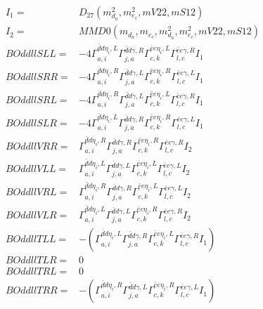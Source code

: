 \documentclass[A4,landscape]{article}
\begin{document}
\begin{align} 
I_1 = & D_{27}(m^2_{d_{{a}}}, m^2_{e_{{c}}}, mV22, mS12) \\ 
I_2 = & MMD0(m_{d_{{a}}}, m_{e_{{c}}}, m^2_{d_{{a}}}, m^2_{e_{{c}}}, mV22, mS12) \\ 
  BOddllSLL= & -4  \Gamma^{\bar{d}d \eta_i ,L}_{a, i} \Gamma^{\bar{d}d \gamma ,R}_{j, a} \Gamma^{\bar{e}e \eta_i ,L}_{c, k} \Gamma^{\bar{e}e \gamma ,R}_{l, c} I_1 \\ 
  BOddllSRR= & -4  \Gamma^{\bar{d}d \eta_i ,R}_{a, i} \Gamma^{\bar{d}d \gamma ,L}_{j, a} \Gamma^{\bar{e}e \eta_i ,R}_{c, k} \Gamma^{\bar{e}e \gamma ,L}_{l, c} I_1 \\ 
  BOddllSRL= & -4  \Gamma^{\bar{d}d \eta_i ,R}_{a, i} \Gamma^{\bar{d}d \gamma ,L}_{j, a} \Gamma^{\bar{e}e \eta_i ,L}_{c, k} \Gamma^{\bar{e}e \gamma ,R}_{l, c} I_1 \\ 
  BOddllSLR= & -4  \Gamma^{\bar{d}d \eta_i ,L}_{a, i} \Gamma^{\bar{d}d \gamma ,R}_{j, a} \Gamma^{\bar{e}e \eta_i ,R}_{c, k} \Gamma^{\bar{e}e \gamma ,L}_{l, c} I_1 \\ 
  BOddllVRR= &  \Gamma^{\bar{d}d \eta_i ,R}_{a, i} \Gamma^{\bar{d}d \gamma ,R}_{j, a} \Gamma^{\bar{e}e \eta_i ,R}_{c, k} \Gamma^{\bar{e}e \gamma ,R}_{l, c} I_2 \\ 
  BOddllVLL= &  \Gamma^{\bar{d}d \eta_i ,L}_{a, i} \Gamma^{\bar{d}d \gamma ,L}_{j, a} \Gamma^{\bar{e}e \eta_i ,L}_{c, k} \Gamma^{\bar{e}e \gamma ,L}_{l, c} I_2 \\ 
  BOddllVRL= &  \Gamma^{\bar{d}d \eta_i ,R}_{a, i} \Gamma^{\bar{d}d \gamma ,R}_{j, a} \Gamma^{\bar{e}e \eta_i ,L}_{c, k} \Gamma^{\bar{e}e \gamma ,L}_{l, c} I_2 \\ 
  BOddllVLR= &  \Gamma^{\bar{d}d \eta_i ,L}_{a, i} \Gamma^{\bar{d}d \gamma ,L}_{j, a} \Gamma^{\bar{e}e \eta_i ,R}_{c, k} \Gamma^{\bar{e}e \gamma ,R}_{l, c} I_2 \\ 
  BOddllTLL= & -( \Gamma^{\bar{d}d \eta_i ,L}_{a, i} \Gamma^{\bar{d}d \gamma ,R}_{j, a} \Gamma^{\bar{e}e \eta_i ,L}_{c, k} \Gamma^{\bar{e}e \gamma ,R}_{l, c} I_1) \\ 
  BOddllTLR= & 0 \\ 
  BOddllTRL= & 0 \\ 
  BOddllTRR= & -( \Gamma^{\bar{d}d \eta_i ,R}_{a, i} \Gamma^{\bar{d}d \gamma ,L}_{j, a} \Gamma^{\bar{e}e \eta_i ,R}_{c, k} \Gamma^{\bar{e}e \gamma ,L}_{l, c} I_1) \\ 
\end{align} 
\end{document}
